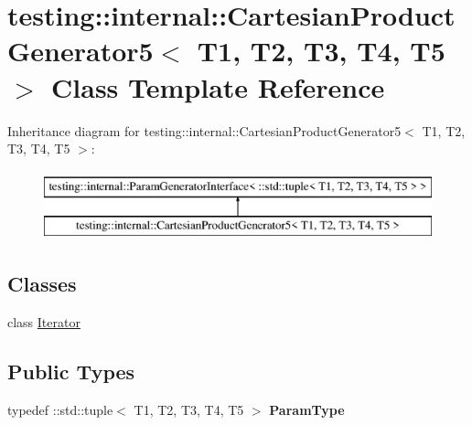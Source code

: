 \hypertarget{classtesting_1_1internal_1_1_cartesian_product_generator5}{}\section{testing\+:\+:internal\+:\+:Cartesian\+Product\+Generator5$<$ T1, T2, T3, T4, T5 $>$ Class Template Reference}
\label{classtesting_1_1internal_1_1_cartesian_product_generator5}
Inheritance diagram for testing\+:\+:internal\+:\+:Cartesian\+Product\+Generator5$<$ T1, T2, T3, T4, T5 $>$\+:\begin{figure}[H]
\begin{center}
\leavevmode
\includegraphics[height=2.000000cm]{classtesting_1_1internal_1_1_cartesian_product_generator5}
\end{center}
\end{figure}
\subsection*{Classes}
\begin{DoxyCompactItemize}
\item 
class \mbox{\hyperlink{classtesting_1_1internal_1_1_cartesian_product_generator5_1_1_iterator}{Iterator}}
\end{DoxyCompactItemize}
\subsection*{Public Types}
\begin{DoxyCompactItemize}
\item 
\mbox{\label{classtesting_1_1internal_1_1_cartesian_product_generator5_a381a9c3c18106872251acffe59453a95}} 
typedef \+::std\+::tuple$<$ T1, T2, T3, T4, T5 $>$ {\bfseries Param\+Type}
\end{DoxyCompactItemize}
